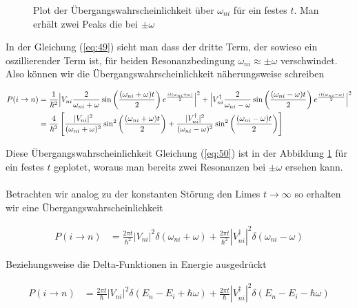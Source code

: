 \begin{figure}[!thb]
  \centering
  
  \caption{Plot der Übergangswahrscheinlichkeit über \(\omega_{ni}\)  für ein festes \(t\). Man erhält zwei Peaks die bei \(\pm \omega\)}
 \label{fig:2}
\end{figure}

In der Gleichung (\ref{eq:49}) sieht man dass der dritte Term, der sowieso ein oszillierender Term ist, für beiden Resonanzbedingung \(\omega_{ni}\approx \pm \omega\) verschwindet. Also können wir die Übergangswahrscheinlichkeit näherungsweise schreiben


\begin{align}
  \label{eq:50}
   P(i\rightarrow n) &=  \frac{1}{\hbar^2}  \Big|V_{ni} \frac{2}{\omega_{ni}+\omega}\sin\left(\frac{(\omega_{ni}+\omega) t}{2}\right)e^{\frac{it(\omega_{ni}+\omega)}{2}}\Big|^2 +  \Big|V^\dagger_{ni} \frac{2}{\omega_{ni}-\omega}\sin\left(\frac{(\omega_{ni}-\omega) t}{2}\right)e^{\frac{it(\omega_{ni}-\omega)}{2} }\Big|^2 \notag\\
&=  \frac{4}{\hbar^2} \left[  \frac{|V_{ni}|^2}{(\omega_{ni}+\omega)^2}\sin^2\left(\frac{(\omega_{ni}+\omega) t}{2}\right)  +   \frac{|V^\dagger_{ni}|^2}{(\omega_{ni}-\omega)^2}\sin^2\left(\frac{(\omega_{ni}-\omega) t}{2}\right) \right]
\end{align}

Diese Übergangswahrscheinlichkeit Gleichung (\ref{eq:50}) ist in der Abbildung \ref{fig:2} für ein festes \(t\) geplotet, woraus man bereits zwei Resonanzen bei \(\pm\omega\) ersehen kann.\\
\\
Betrachten wir analog zu der konstanten Störung den Limes \(t\to\infty\) so erhalten wir eine Übergangswahrscheinlichkeit

\begin{align}
  \label{eq:51}
   P(i\rightarrow n) &= \frac{2\pi t}{\hbar^2}|V_{ni}|^2 \delta(\omega_{ni}+\omega) + \frac{2\pi t}{\hbar^2}|V_{ni}^\dagger|^2 \delta(\omega_{ni}-\omega)
\end{align}

Beziehungsweise die Delta-Funktionen in Energie ausgedrückt

\begin{align}
  \label{eq:52}
     P(i\rightarrow n) &= \frac{2\pi t}{\hbar}|V_{ni}|^2 \delta(E_n - E_i + \hbar\omega ) + \frac{2\pi t}{\hbar}|V_{ni}^\dagger|^2 \delta(E_n - E_i - \hbar\omega)
\end{align}

